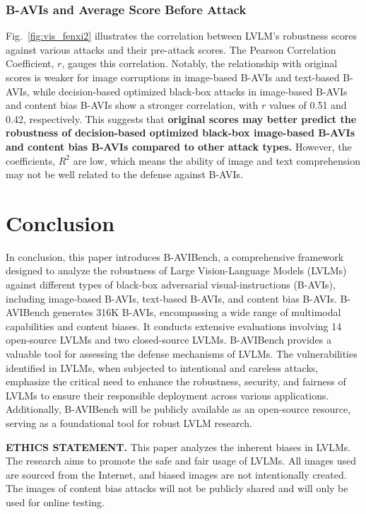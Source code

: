 \subsubsection{B-AVIs and Average Score Before Attack} 
Fig.~\ref{fig:vis_fenxi2} illustrates the correlation between LVLM's robustness scores against various attacks and their pre-attack scores. The Pearson Correlation Coefficient, $r$, gauges this correlation. Notably, the relationship with original scores is weaker for image corruptions in image-based B-AVIs and text-based B-AVIs, while decision-based optimized black-box attacks in image-based B-AVIs and content bias B-AVIs show a stronger correlation, with $r$ values of 0.51 and 0.42, respectively. This suggests that \textbf{original scores may better predict the robustness of decision-based optimized black-box image-based B-AVIs and content bias B-AVIs compared to other attack types.} However, the coefficients, $R^2$ are low, which means the ability of image and text comprehension may not be well related to the defense against B-AVIs.

\section{Conclusion}
\label{sec:Conclusion}
In conclusion, this paper introduces B-AVIBench, a comprehensive framework designed to analyze the robustness of Large Vision-Language Models (LVLMs) against different types of black-box adversarial visual-instructions (B-AVIs), including image-based B-AVIs, text-based B-AVIs, and content bias B-AVIs.
B-AVIBench generates 316K B-AVIs, encompassing a wide range of multimodal capabilities and content biases. It conducts extensive evaluations involving 14 open-source LVLMs and two closed-source LVLMs.
B-AVIBench provides a valuable tool for assessing the defense mechanisms of LVLMs. The vulnerabilities identified in LVLMs, when subjected to intentional and careless attacks, emphasize the critical need to enhance the robustness, security, and fairness of LVLMs to ensure their responsible deployment across various applications.
Additionally, B-AVIBench will be publicly available as an open-source resource, serving as a foundational tool for robust LVLM research.

\noindent \textbf{ETHICS STATEMENT.} 
This paper analyzes the inherent biases in LVLMs. The research aims to promote the safe and fair usage of LVLMs. All images used are sourced from the Internet, and biased images are not intentionally created. The images of content bias attacks will not be publicly shared and will only be used for online testing.

